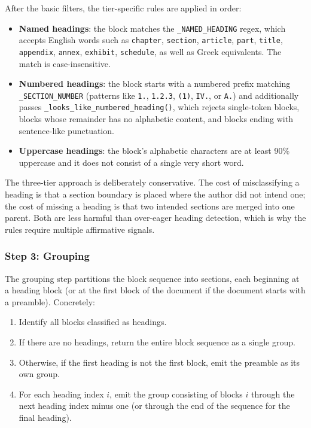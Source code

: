 \documentclass[11pt,a4paper]{article}
\begin{document}
After the basic filters, the tier-specific rules are applied in
order:

\begin{itemize}[leftmargin=1.5em,itemsep=0.15em]
  \item \textbf{Named headings}: the block matches the
    \texttt{\_NAMED\_HEADING} regex, which accepts English words
    such as \texttt{chapter}, \texttt{section}, \texttt{article},
    \texttt{part}, \texttt{title}, \texttt{appendix}, \texttt{annex},
    \texttt{exhibit}, \texttt{schedule}, as well as Greek equivalents.
    The match is case-insensitive.
  \item \textbf{Numbered headings}: the block starts with a numbered
    prefix matching \texttt{\_SECTION\_NUMBER} (patterns like
    \texttt{1.}, \texttt{1.2.3}, \texttt{(1)}, \texttt{IV.}, or
    \texttt{A.}) and additionally passes
    \texttt{\_looks\_like\_numbered\_heading()}, which rejects
    single-token blocks, blocks whose remainder has no alphabetic
    content, and blocks ending with sentence-like punctuation.
  \item \textbf{Uppercase headings}: the block's alphabetic
    characters are at least \num{90}\% uppercase and it does not
    consist of a single very short word.
\end{itemize}

The three-tier approach is deliberately conservative. The cost of
misclassifying a heading is that a section boundary is placed where
the author did not intend one; the cost of missing a heading is that
two intended sections are merged into one parent. Both are less
harmful than over-eager heading detection, which is why the rules
require multiple affirmative signals.

\subsubsection{Step 3: Grouping}
The grouping step partitions the block sequence into sections, each
beginning at a heading block (or at the first block of the document
if the document starts with a preamble). Concretely:

\begin{enumerate}[leftmargin=1.5em,itemsep=0.15em]
  \item Identify all blocks classified as headings.
  \item If there are no headings, return the entire block sequence
    as a single group.
  \item Otherwise, if the first heading is not the first block,
    emit the preamble as its own group.
  \item For each heading index $i$, emit the group consisting of
    blocks $i$ through the next heading index minus one (or through
    the end of the sequence for the final heading).
\end{enumerate}
\end{document}
